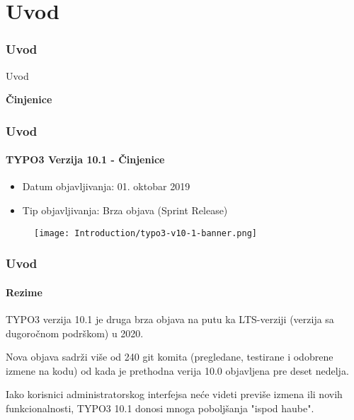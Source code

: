 %

\section{Uvod}
\begin{frame}[fragile]
	\frametitle{Uvod}

	\begin{center}\huge{Uvod}\end{center}
	\begin{center}\huge{\color{typo3darkgrey}\textbf{Činjenice}}\end{center}

\end{frame}


\begin{frame}[fragile]
	\frametitle{Uvod}
	\framesubtitle{TYPO3 Verzija 10.1 - Činjenice}

	\begin{itemize}
		\item Datum objavljivanja: 01. oktobar 2019
		\item Tip objavljivanja: Brza objava (Sprint Release)
	\end{itemize}

	\begin{figure}
		\texttt{[image: Introduction/typo3-v10-1-banner.png]}
	\end{figure}

\end{frame}


\begin{frame}[fragile]
	\frametitle{Uvod}
	\framesubtitle{Rezime}

	\small
		TYPO3 verzija 10.1 je druga brza objava na putu ka LTS-verziji
		(verzija sa dugoročnom podrškom) u 2020.

		\vspace{0.2cm}

		Nova objava sadrži više od 240 git komita (pregledane, testirane i
		odobrene izmene na kodu) od kada je prethodna verija 10.0 objavljena pre
		deset nedelja.

		\vspace{0.2cm}

		Iako korisnici administratorskog interfejsa neće videti previše izmena ili
		novih funkcionalnosti, TYPO3 10.1 donosi mnoga poboljšanja "ispod haube".

	\normalsize

\end{frame}


